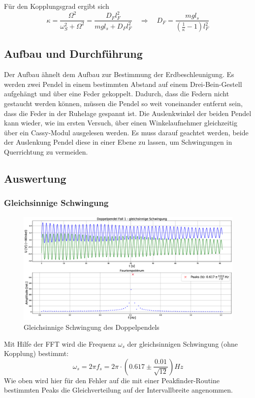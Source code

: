 \documentclass[a4paper, 11pt]{article}
\begin{document}
Für den Kopplungsgrad ergibt sich 
\begin{equation}\label{eq:kappa}
\kappa = \frac{\Omega^2}{\omega_S^2 + \Omega^2} = \frac{D_F l_F^2}{mgl_s + D_F l_F^2 } \quad \Rightarrow \quad D_F = \frac{mgl_s}{\left(\frac{1}{\kappa}-1\right) l_F^2 } 
\end{equation}


\subsection{Aufbau und Durchführung}
Der Aufbau ähnelt dem Aufbau zur Bestimmung der Erdbeschleunigung. Es werden zwei Pendel in einem bestimmten Abstand auf einem Drei-Bein-Gestell aufgehängt und über eine Feder gekoppelt. Dadurch, dass die Federn nicht gestaucht werden können, müssen die Pendel so weit voneinander entfernt sein, dass die Feder in der Ruhelage gespannt ist. Die Auslenkwinkel der beiden Pendel kann wieder, wie im ersten Versuch, über einen Winkelaufnehmer gleichzeitig über ein Cassy-Modul ausgelesen werden. Es muss darauf geachtet werden, beide der Auslenkung Pendel diese in einer Ebene zu lassen, um Schwingungen in Querrichtung zu vermeiden.

\subsection{Auswertung}

\subsubsection{Gleichsinnige Schwingung}
\begin{figure}[H]
	\centering
	\includegraphics[scale=0.3]{Plots/Doppelpendel1.eps}
	\caption{Gleichsinnige Schwingung des Doppelpendels}
	\label{pic:Doppelpendel1}
\end{figure}
Mit Hilfe der FFT wird die Frequenz $\omega_s$ der gleichsinnigen Schwingung (ohne Kopplung) bestimmt:
\begin{equation*}
	\omega_s = 2\pi f_s = 2\pi \cdot \left( 0.617 \pm \frac{0.01}{\sqrt{12}} \right) Hz
\end{equation*}
Wie oben wird hier für den Fehler auf die mit einer Peakfinder-Routine bestimmten Peaks die Gleichverteilung auf der Intervallbreite angenommen.
\end{document}
